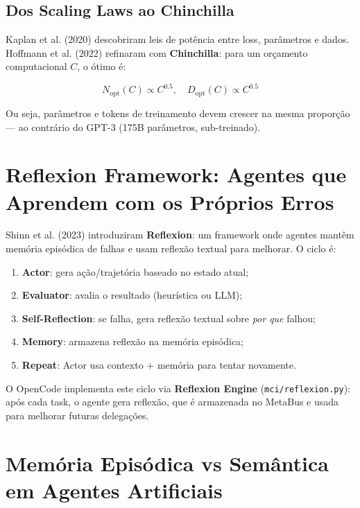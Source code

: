 \subsection{Dos Scaling Laws ao Chinchilla}

Kaplan et al. (2020) \cite{kaplan2020scaling} descobriram leis de potência entre loss, parâmetros e dados. Hoffmann et al. (2022) \cite{hoffmann2022training} refinaram com \textbf{Chinchilla}: para um orçamento computacional $C$, o ótimo é:

\begin{equation}
N_{\text{opt}}(C) \propto C^{0.5}, \quad D_{\text{opt}}(C) \propto C^{0.5}
\label{eq:chinchilla}
\end{equation}

Ou seja, parâmetros e tokens de treinamento devem crescer na mesma proporção — ao contrário do GPT-3 (175B parâmetros, sub-treinado).

\section{Reflexion Framework: Agentes que Aprendem com os Próprios Erros}

Shinn et al. (2023) \cite{shinn2023reflexion} introduziram \textbf{Reflexion}: um framework onde agentes mantêm memória episódica de falhas e usam reflexão textual para melhorar. O ciclo é:

\begin{enumerate}
    \item \textbf{Actor}: gera ação/trajetória baseado no estado atual;
    \item \textbf{Evaluator}: avalia o resultado (heurística ou LLM);
    \item \textbf{Self-Reflection}: se falha, gera reflexão textual sobre \textit{por que} falhou;
    \item \textbf{Memory}: armazena reflexão na memória episódica;
    \item \textbf{Repeat}: Actor usa contexto + memória para tentar novamente.
\end{enumerate}

O OpenCode implementa este ciclo via \textbf{Reflexion Engine} (\texttt{mci/reflexion.py}): após cada task, o agente gera reflexão, que é armazenada no MetaBus e usada para melhorar futuras delegações.

\section{Memória Episódica vs Semântica em Agentes Artificiais}

